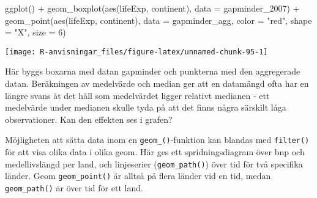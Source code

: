 \documentclass[
]{book}
\newenvironment{Shaded}{\begin{snugshade}}{\end{snugshade}}
\newcommand{\AttributeTok}[1]{\textcolor[rgb]{0.77,0.63,0.00}{#1}}
\newcommand{\DecValTok}[1]{\textcolor[rgb]{0.00,0.00,0.81}{#1}}
\newcommand{\FunctionTok}[1]{\textcolor[rgb]{0.00,0.00,0.00}{#1}}
\newcommand{\NormalTok}[1]{#1}
\newcommand{\SpecialCharTok}[1]{\textcolor[rgb]{0.00,0.00,0.00}{#1}}
\newcommand{\StringTok}[1]{\textcolor[rgb]{0.31,0.60,0.02}{#1}}
\theoremstyle{definition}
\theoremstyle{definition}
\theoremstyle{definition}
\theoremstyle{definition}
\theoremstyle{remark}
\begin{document}
\begin{Shaded}
\begin{Highlighting}[]
\FunctionTok{ggplot}\NormalTok{() }\SpecialCharTok{+}
  \FunctionTok{geom\_boxplot}\NormalTok{(}\FunctionTok{aes}\NormalTok{(lifeExp, continent), }\AttributeTok{data =}\NormalTok{ gapminder\_2007) }\SpecialCharTok{+}
  \FunctionTok{geom\_point}\NormalTok{(}\FunctionTok{aes}\NormalTok{(lifeExp, continent), }\AttributeTok{data =}\NormalTok{ gapminder\_agg, }\AttributeTok{color =} \StringTok{"red"}\NormalTok{, }\AttributeTok{shape =} \StringTok{"X"}\NormalTok{, }\AttributeTok{size =} \DecValTok{6}\NormalTok{)}
\end{Highlighting}
\end{Shaded}

\begin{center}\texttt{[image: R-anvisningar\_files/figure-latex/unnamed-chunk-95-1]} \end{center}

Här byggs boxarna med datan gapminder och punkterna med den aggregerade datan. Beräkningen av medelvärde och median ger att en datamängd ofta har en längre svans åt det håll som medelvärdet ligger relativt medianen - ett medelvärde under medianen skulle tyda på att det finns några särskilt låga observationer. Kan den effekten ses i grafen?

Möjligheten att sätta data inom en \texttt{geom\_()}-funktion kan blandas med \texttt{filter()} för att visa olika data i olika geom. Här ges ett spridningsdiagram över bnp och medellivslängd per land, och linjeserier (\texttt{geom\_path()}) över tid för två specifika länder. Geom \texttt{geom\_point()} är alltså på flera länder vid en tid, medan \texttt{geom\_path()} är över tid för ett land.
\end{document}
